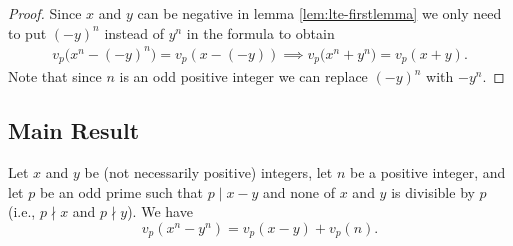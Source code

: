 \documentclass[main.tex]{subfile}
\begin{document}
    \begin{proof}
        Since $x$ and $y$ can be negative in lemma \eqref{lem:lte-firstlemma} we only need to put $(-y)^n$ instead of $y^n$ in the formula to obtain
	         \begin{align*}
		         v_p\big( x^n - (-y)^n \big) = v_p ( x - (-y)) \implies v_p\big(x^n + y^n\big) = v_p(x+y).
	         \end{align*}
        Note that since $n$ is an odd positive integer we can replace $(-y)^n$ with $-y^n$.
    \end{proof}

\subsection{Main Result}

    \begin{theorem}\label{theorem1}
        Let $ x$ and $y$ be (not necessarily positive) integers, let $n$ be a positive integer, and let $p$ be an odd prime such that $ p \mid x - y$ and none of
        $x$ and $y$ is divisible by $p$ (i.e., $p \nmid x$ and $p \nmid y$).  We have
        \[ v_p(  x^n - y^n ) = v_p(  x - y ) + v_p  (n ).\]
    \end{theorem}
    
\end{document}
